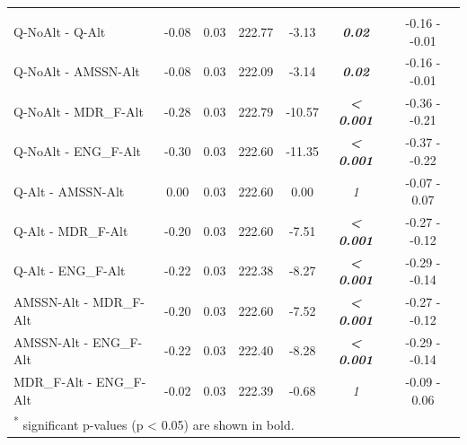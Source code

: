 \documentclass[a4paper, twoside]{templates/ociamthesis}
\begin{document}
\begin{table}
{\begin{tabular}[t]{lcccc>{}cc}
\addlinespace[0.3em]
\multicolumn{7}{l}{\textbf{CCRM}}\\
\hspace{1em}Q-NoAlt - Q-Alt & -0.08 & 0.03 & 222.77 & -3.13 & \em{\textbf{0.02}} & -0.16 - -0.01\\
\hspace{1em}Q-NoAlt - AMSSN-Alt & -0.08 & 0.03 & 222.09 & -3.14 & \em{\textbf{0.02}} & -0.16 - -0.01\\
\hspace{1em}Q-NoAlt - MDR\_F-Alt & -0.28 & 0.03 & 222.79 & -10.57 & \em{\textbf{< 0.001}} & -0.36 - -0.21\\
\hspace{1em}Q-NoAlt - ENG\_F-Alt & -0.30 & 0.03 & 222.60 & -11.35 & \em{\textbf{< 0.001}} & -0.37 - -0.22\\
\hspace{1em}Q-Alt - AMSSN-Alt & 0.00 & 0.03 & 222.60 & 0.00 & \em{1} & -0.07 - 0.07\\
\hspace{1em}Q-Alt - MDR\_F-Alt & -0.20 & 0.03 & 222.60 & -7.51 & \em{\textbf{< 0.001}} & -0.27 - -0.12\\
\hspace{1em}Q-Alt - ENG\_F-Alt & -0.22 & 0.03 & 222.38 & -8.27 & \em{\textbf{< 0.001}} & -0.29 - -0.14\\
\hspace{1em}AMSSN-Alt - MDR\_F-Alt & -0.20 & 0.03 & 222.60 & -7.52 & \em{\textbf{< 0.001}} & -0.27 - -0.12\\
\hspace{1em}AMSSN-Alt - ENG\_F-Alt & -0.22 & 0.03 & 222.40 & -8.28 & \em{\textbf{< 0.001}} & -0.29 - -0.14\\
\hspace{1em}MDR\_F-Alt - ENG\_F-Alt & -0.02 & 0.03 & 222.39 & -0.68 & \em{1} & -0.09 - 0.06\\
\bottomrule
\multicolumn{7}{l}{\textsuperscript{*} significant p-values (p < 0.05) are shown in bold.}\\
\end{tabular}}
\end{table}
\end{document}
